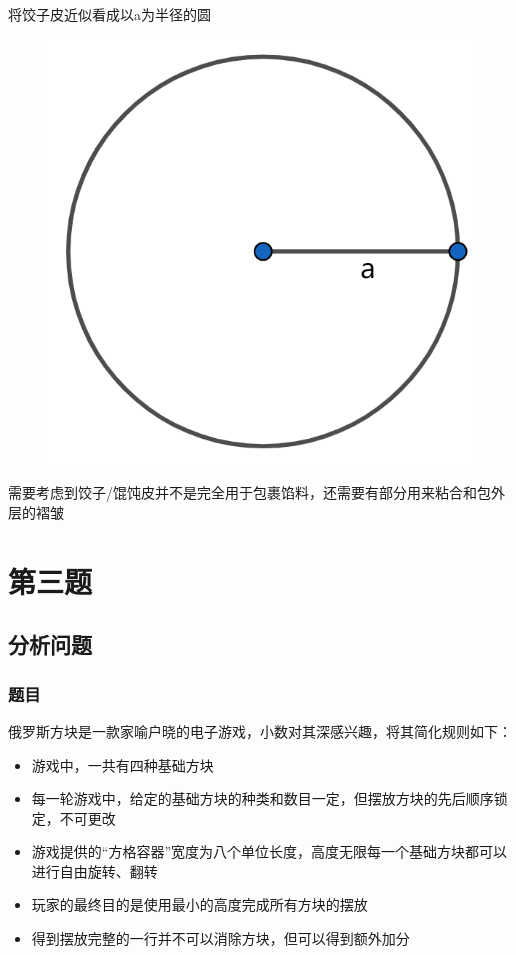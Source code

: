 \documentclass[lang=cn,a4paper]{elegantpaper}
\begin{document}
    将饺子皮近似看成以a为半径的圆
    \begin{figure}[H]
        \centering
        \includegraphics[scale=0.4]{circle.png}
    \end{figure}
    需要考虑到饺子/馄饨皮并不是完全用于包裹馅料，还需要有部分用来粘合和包外层的褶皱

    \section{第三题}
    \subsection{分析问题}
    \subsubsection*{题目}
    俄罗斯方块是一款家喻户晓的电子游戏，小数对其深感兴趣，将其简化规则如下：
    \begin{itemize}
        \item 游戏中，一共有四种基础方块
        \item 每一轮游戏中，给定的基础方块的种类和数目一定，但摆放方块的先后顺序锁定，不可更改
        \item 游戏提供的“方格容器”宽度为八个单位长度，高度无限每一个基础方块都可以进行自由旋转、翻转
        \item 玩家的最终目的是使用最小的高度完成所有方块的摆放
        \item 得到摆放完整的一行并不可以消除方块，但可以得到额外加分
    \end{itemize}
\end{document}
